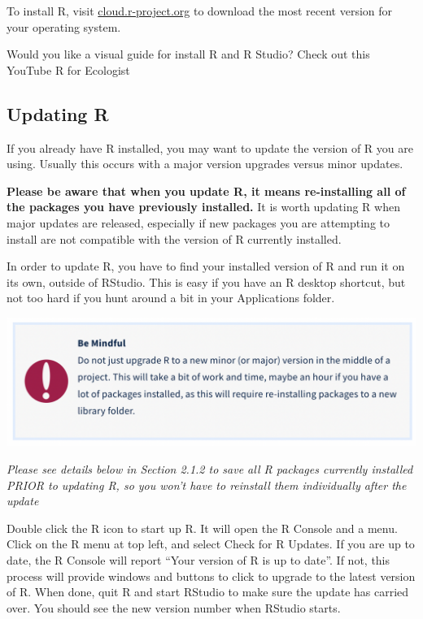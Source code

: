 \documentclass[
]{book}
\begin{document}
To install R, visit \href{https://cloud.r-project.org/}{cloud.r-project.org} to download the most recent version for your operating system.

Would you like a visual guide for install R and R Studio? Check out this YouTube R for Ecologist

\hypertarget{updating-r}{%
\subsection{Updating R}\label{updating-r}}

If you already have R installed, you may want to update the version of R you are using. Usually this occurs with a major version upgrades versus minor updates.

\textbf{Please be aware that when you update R, it means re-installing all of the packages you have previously installed.} It is worth updating R when major updates are released, especially if new packages you are attempting to install are not compatible with the version of R currently installed.

In order to update R, you have to find your installed version of R and run it on its own, outside of RStudio. This is easy if you have an R desktop shortcut, but not too hard if you hunt around a bit in your Applications folder.

\begin{flushleft}\includegraphics[width=1\linewidth]{images/rupdate} \end{flushleft}

\emph{Please see details below in Section 2.1.2 to save all R packages currently installed PRIOR to updating R, so you won't have to reinstall them individually after the update}

Double click the R icon to start up R. It will open the R Console and a menu. Click on the R menu at top left, and select Check for R Updates. If you are up to date, the R Console will report ``Your version of R is up to date''. If not, this process will provide windows and buttons to click to upgrade to the latest version of R. When done, quit R and start RStudio to make sure the update has carried over. You should see the new version number when RStudio starts.
\end{document}
